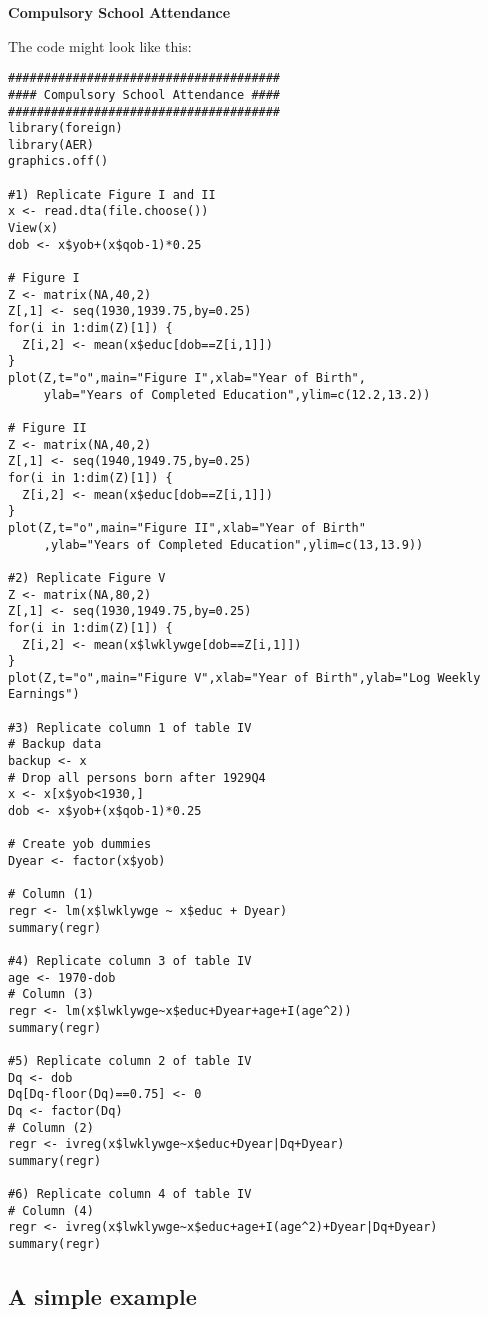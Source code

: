 \documentclass{article}
\begin{document}
\begin{solution}
\textbf{Compulsory School Attendance}

The code might look like this:
\begin{verbatim}
######################################
#### Compulsory School Attendance ####
######################################
library(foreign)
library(AER)
graphics.off()

#1) Replicate Figure I and II
x <- read.dta(file.choose())
View(x)
dob <- x$yob+(x$qob-1)*0.25

# Figure I
Z <- matrix(NA,40,2)
Z[,1] <- seq(1930,1939.75,by=0.25)
for(i in 1:dim(Z)[1]) {
  Z[i,2] <- mean(x$educ[dob==Z[i,1]])
}
plot(Z,t="o",main="Figure I",xlab="Year of Birth",
     ylab="Years of Completed Education",ylim=c(12.2,13.2))

# Figure II
Z <- matrix(NA,40,2)
Z[,1] <- seq(1940,1949.75,by=0.25)
for(i in 1:dim(Z)[1]) {
  Z[i,2] <- mean(x$educ[dob==Z[i,1]])
}
plot(Z,t="o",main="Figure II",xlab="Year of Birth"
     ,ylab="Years of Completed Education",ylim=c(13,13.9))

#2) Replicate Figure V
Z <- matrix(NA,80,2)
Z[,1] <- seq(1930,1949.75,by=0.25)
for(i in 1:dim(Z)[1]) {
  Z[i,2] <- mean(x$lwklywge[dob==Z[i,1]])
}
plot(Z,t="o",main="Figure V",xlab="Year of Birth",ylab="Log Weekly Earnings")

#3) Replicate column 1 of table IV
# Backup data
backup <- x
# Drop all persons born after 1929Q4
x <- x[x$yob<1930,]
dob <- x$yob+(x$qob-1)*0.25

# Create yob dummies
Dyear <- factor(x$yob)

# Column (1)
regr <- lm(x$lwklywge ~ x$educ + Dyear)
summary(regr)

#4) Replicate column 3 of table IV
age <- 1970-dob
# Column (3)
regr <- lm(x$lwklywge~x$educ+Dyear+age+I(age^2))
summary(regr)

#5) Replicate column 2 of table IV
Dq <- dob
Dq[Dq-floor(Dq)==0.75] <- 0
Dq <- factor(Dq)
# Column (2)
regr <- ivreg(x$lwklywge~x$educ+Dyear|Dq+Dyear)
summary(regr)

#6) Replicate column 4 of table IV
# Column (4)
regr <- ivreg(x$lwklywge~x$educ+age+I(age^2)+Dyear|Dq+Dyear)
summary(regr)
\end{verbatim}
\end{solution}

\subsection{A simple example}
\end{document}
